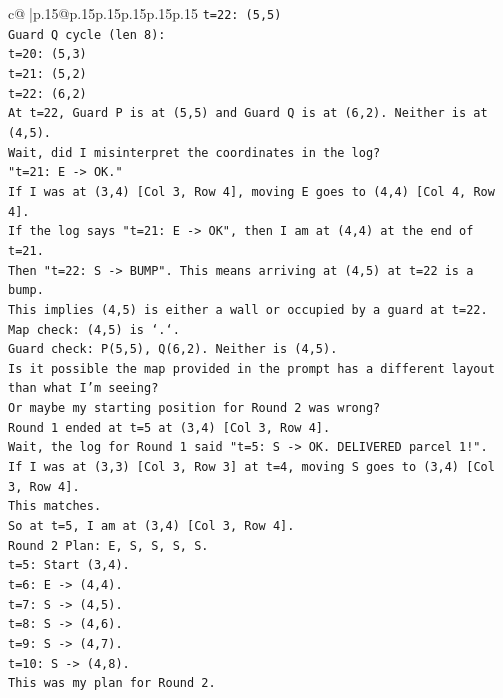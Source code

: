 \documentclass{article}
\begin{document}
{\begin{supertabular}{c@{$\;$}|p{.15\linewidth}@{}p{.15\linewidth}p{.15\linewidth}p{.15\linewidth}p{.15\linewidth}p{.15\linewidth}}
{{{\texttt{t=22: (5,5)} \\
\texttt{Guard Q cycle (len 8):} \\
\texttt{t=20: (5,3)} \\
\texttt{t=21: (5,2)} \\
\texttt{t=22: (6,2)} \\
\texttt{At t=22, Guard P is at (5,5) and Guard Q is at (6,2). Neither is at (4,5).} \\
\texttt{Wait, did I misinterpret the coordinates in the log?} \\
\texttt{"t=21: E {-}> OK."} \\
\texttt{If I was at (3,4) {[}Col 3, Row 4{]}, moving E goes to (4,4) {[}Col 4, Row 4{]}.} \\
\texttt{If the log says "t=21: E {-}> OK", then I am at (4,4) at the end of t=21.} \\
\texttt{Then "t=22: S {-}> BUMP". This means arriving at (4,5) at t=22 is a bump.} \\
\texttt{This implies (4,5) is either a wall or occupied by a guard at t=22.} \\
\texttt{Map check: (4,5) is `.`.} \\
\texttt{Guard check: P(5,5), Q(6,2). Neither is (4,5).} \\
\texttt{Is it possible the map provided in the prompt has a different layout than what I'm seeing?} \\
\texttt{Or maybe my starting position for Round 2 was wrong?} \\
\texttt{Round 1 ended at t=5 at (3,4) {[}Col 3, Row 4{]}.} \\
\texttt{Wait, the log for Round 1 said "t=5: S {-}> OK. DELIVERED parcel 1!".} \\
\texttt{If I was at (3,3) {[}Col 3, Row 3{]} at t=4, moving S goes to (3,4) {[}Col 3, Row 4{]}.} \\
\texttt{This matches.} \\
\texttt{So at t=5, I am at (3,4) {[}Col 3, Row 4{]}.} \\
\texttt{Round 2 Plan: E, S, S, S, S.} \\
\texttt{t=5: Start (3,4).} \\
\texttt{t=6: E {-}> (4,4).} \\
\texttt{t=7: S {-}> (4,5).} \\
\texttt{t=8: S {-}> (4,6).} \\
\texttt{t=9: S {-}> (4,7).} \\
\texttt{t=10: S {-}> (4,8).} \\
\texttt{This was my plan for Round 2.} \\
}}}
\end{supertabular}}
\end{document}
